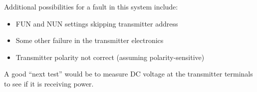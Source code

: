 Additional possibilities for a fault in this system include:

\begin{itemize}
\item{} FUN and NUN settings skipping transmitter address
\item{} Some other failure in the transmitter electronics
\item{} Transmitter polarity not correct (assuming polarity-sensitive)
\end{itemize}

\vskip 10pt

A good ``next test'' would be to measure DC voltage at the transmitter terminals to see if it is receiving power.



